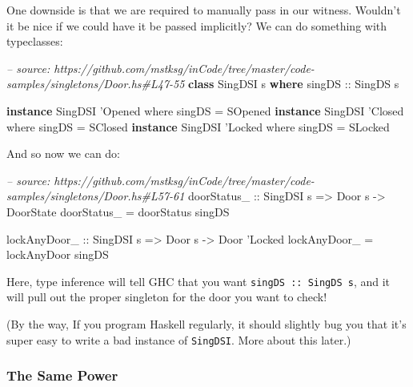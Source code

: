 \documentclass[]{article}
\newenvironment{Shaded}{}{}
\newcommand{\KeywordTok}[1]{\textcolor[rgb]{0.00,0.44,0.13}{\textbf{#1}}}
\newcommand{\DataTypeTok}[1]{\textcolor[rgb]{0.56,0.13,0.00}{#1}}
\newcommand{\CharTok}[1]{\textcolor[rgb]{0.25,0.44,0.63}{#1}}
\newcommand{\CommentTok}[1]{\textcolor[rgb]{0.38,0.63,0.69}{\textit{#1}}}
\newcommand{\OtherTok}[1]{\textcolor[rgb]{0.00,0.44,0.13}{#1}}
\newcommand{\FunctionTok}[1]{\textcolor[rgb]{0.02,0.16,0.49}{#1}}
\newcommand{\NormalTok}[1]{#1}
\begin{document}
One downside is that we are required to manually pass in our witness. Wouldn't
it be nice if we could have it be passed implicitly? We can do something with
typeclasses:

\begin{Shaded}
\begin{Highlighting}[]
\CommentTok{-- source: https://github.com/mstksg/inCode/tree/master/code-samples/singletons/Door.hs#L47-55}
\KeywordTok{class} \DataTypeTok{SingDSI}\NormalTok{ s }\KeywordTok{where}
\OtherTok{    singDS ::} \DataTypeTok{SingDS}\NormalTok{ s}

\KeywordTok{instance} \DataTypeTok{SingDSI} \CharTok{'Opened where}
\NormalTok{    singDS }\FunctionTok{=} \DataTypeTok{SOpened}
\KeywordTok{instance} \DataTypeTok{SingDSI} \CharTok{'Closed where}
\NormalTok{    singDS }\FunctionTok{=} \DataTypeTok{SClosed}
\KeywordTok{instance} \DataTypeTok{SingDSI} \CharTok{'Locked where}
\NormalTok{    singDS }\FunctionTok{=} \DataTypeTok{SLocked}
\end{Highlighting}
\end{Shaded}

And so now we can do:

\begin{Shaded}
\begin{Highlighting}[]
\CommentTok{-- source: https://github.com/mstksg/inCode/tree/master/code-samples/singletons/Door.hs#L57-61}
\OtherTok{doorStatus_ ::} \DataTypeTok{SingDSI}\NormalTok{ s }\OtherTok{=>} \DataTypeTok{Door}\NormalTok{ s }\OtherTok{->} \DataTypeTok{DoorState}
\NormalTok{doorStatus_ }\FunctionTok{=}\NormalTok{ doorStatus singDS}

\OtherTok{lockAnyDoor_ ::} \DataTypeTok{SingDSI}\NormalTok{ s }\OtherTok{=>} \DataTypeTok{Door}\NormalTok{ s }\OtherTok{->} \DataTypeTok{Door} \CharTok{'Locked}
\NormalTok{lockAnyDoor_ }\FunctionTok{=}\NormalTok{ lockAnyDoor singDS}
\end{Highlighting}
\end{Shaded}

Here, type inference will tell GHC that you want \texttt{singDS\ ::\ SingDS\ s},
and it will pull out the proper singleton for the door you want to check!

(By the way, If you program Haskell regularly, it should slightly bug you that
it's super easy to write a bad instance of \texttt{SingDSI}. More about this
later.)

\subsubsection{The Same Power}\label{the-same-power}
\end{document}
